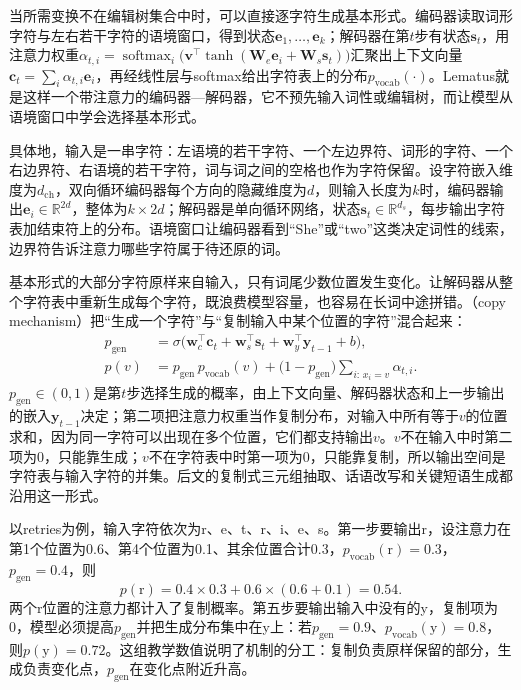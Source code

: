 当所需变换不在编辑树集合中时，可以直接逐字符生成基本形式。编码器读取词形字符与左右若干字符的语境窗口，得到状态$\bm e_1,\ldots,\bm e_k$；解码器在第$t$步有状态$\bm s_t$，用注意力权重$\alpha_{t,i}=\operatorname{softmax}_i\bigl(\bm v^\top\tanh(\bm W_e\bm e_i+\bm W_s\bm s_t)\bigr)$汇聚出上下文向量$\bm c_t=\sum_i\alpha_{t,i}\bm e_i$，再经线性层与softmax给出字符表上的分布$p_{\mathrm{vocab}}(\cdot)$。Lematus就是这样一个带注意力的编码器—解码器，它不预先输入词性或编辑树，而让模型从语境窗口中学会选择基本形式。

具体地，输入是一串字符：左语境的若干字符、一个左边界符、词形的字符、一个右边界符、右语境的若干字符，词与词之间的空格也作为字符保留。设字符嵌入维度为$d_{\mathrm{ch}}$，双向循环编码器每个方向的隐藏维度为$d$，则输入长度为$k$时，编码器输出$\bm e_i\in\mathbb R^{2d}$，整体为$k\times2d$；解码器是单向循环网络，状态$\bm s_t\in\mathbb R^{d_s}$，每步输出字符表加结束符上的分布。语境窗口让编码器看到“She”或“two”这类决定词性的线索，边界符告诉注意力哪些字符属于待还原的词。

基本形式的大部分字符原样来自输入，只有词尾少数位置发生变化。让解码器从整个字符表中重新生成每个字符，既浪费模型容量，也容易在长词中途拼错。（copy mechanism）把“生成一个字符”与“复制输入中某个位置的字符”混合起来：
\begin{equation}
  \begin{aligned}
    p_{\mathrm{gen}}&=\sigma\bigl(\bm w_c^\top\bm c_t+\bm w_s^\top\bm s_t+\bm w_y^\top\bm y_{t-1}+b\bigr),\\
    p(v)&=p_{\mathrm{gen}}\,p_{\mathrm{vocab}}(v)+\bigl(1-p_{\mathrm{gen}}\bigr)\sum_{i:\,x_i=v}\alpha_{t,i}.
  \end{aligned}
  \label{eq:nlp-analysis-copy}
\end{equation}
$p_{\mathrm{gen}}\in(0,1)$是第$t$步选择生成的概率，由上下文向量、解码器状态和上一步输出的嵌入$\bm y_{t-1}$决定；第二项把注意力权重当作复制分布，对输入中所有等于$v$的位置求和，因为同一字符可以出现在多个位置，它们都支持输出$v$。$v$不在输入中时第二项为0，只能靠生成；$v$不在字符表中时第一项为0，只能靠复制，所以输出空间是字符表与输入字符的并集。后文的复制式三元组抽取、话语改写和关键短语生成都沿用这一形式。

以retries为例，输入字符依次为r、e、t、r、i、e、s。第一步要输出r，设注意力在第1个位置为0.6、第4个位置为0.1、其余位置合计0.3，$p_{\mathrm{vocab}}(\mathrm r)=0.3$，$p_{\mathrm{gen}}=0.4$，则
\[
  p(\mathrm r)=0.4\times0.3+0.6\times(0.6+0.1)=0.54.
\]
两个r位置的注意力都计入了复制概率。第五步要输出输入中没有的y，复制项为0，模型必须提高$p_{\mathrm{gen}}$并把生成分布集中在y上：若$p_{\mathrm{gen}}=0.9$、$p_{\mathrm{vocab}}(\mathrm y)=0.8$，则$p(\mathrm y)=0.72$。这组教学数值说明了机制的分工：复制负责原样保留的部分，生成负责变化点，$p_{\mathrm{gen}}$在变化点附近升高。

